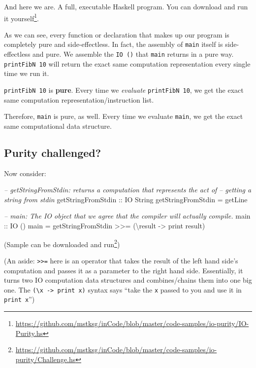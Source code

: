 \documentclass[]{article}
\newenvironment{Shaded}{}{}
\newcommand{\DataTypeTok}[1]{\textcolor[rgb]{0.56,0.13,0.00}{{#1}}}
\newcommand{\CommentTok}[1]{\textcolor[rgb]{0.38,0.63,0.69}{\textit{{#1}}}}
\newcommand{\OtherTok}[1]{\textcolor[rgb]{0.00,0.44,0.13}{{#1}}}
\newcommand{\FunctionTok}[1]{\textcolor[rgb]{0.02,0.16,0.49}{{#1}}}
\newcommand{\NormalTok}[1]{{#1}}
\renewcommand{\href}[2]{#2\footnote{\url{#1}}}
\begin{document}
And here we are. A full, executable Haskell program. You can
\href{https://github.com/mstksg/inCode/blob/master/code-samples/io-purity/IO-Purity.hs}{download and
run it yourself}.

As we can see, every function or declaration that makes up our program is completely pure and
side-effectless. In fact, the assembly of \texttt{main} itself is side-effectless and pure. We
assemble the \texttt{IO\ ()} that \texttt{main} returns in a pure way. \texttt{printFibN\ 10} will
return the exact same computation representation every single time we run it.

\texttt{printFibN\ 10} is \textbf{pure}. Every time we \emph{evaluate} \texttt{printFibN\ 10}, we
get the exact same computation representation/instruction list.

Therefore, \texttt{main} is pure, as well. Every time we evaluate \texttt{main}, we get the exact
same computational data structure.

\subsection{Purity challenged?}\label{purity-challenged}

Now consider:

\begin{Shaded}
\begin{Highlighting}[]
\CommentTok{--  getStringFromStdin: returns a computation that represents the act of}
\CommentTok{--      getting a string from stdin}
\OtherTok{getStringFromStdin ::} \DataTypeTok{IO} \DataTypeTok{String}
\NormalTok{getStringFromStdin }\FunctionTok{=} \NormalTok{getLine}

\CommentTok{--  main: The IO object that we agree that the compiler will actually compile.}
\OtherTok{main ::} \DataTypeTok{IO} \NormalTok{()}
\NormalTok{main }\FunctionTok{=} \NormalTok{getStringFromStdin }\FunctionTok{>>=} \NormalTok{(\textbackslash{}result }\OtherTok{->} \NormalTok{print result)}
\end{Highlighting}
\end{Shaded}

(Sample can be
\href{https://github.com/mstksg/inCode/blob/master/code-samples/io-purity/Challenge.hs}{downloaded
and run})

(An aside: \texttt{\textgreater{}\textgreater{}=} here is an operator that takes the result of the
left hand side's computation and passes it as a parameter to the right hand side. Essentially, it
turns two IO computation data structures and combines/chains them into one big one. The
\texttt{(\textbackslash{}x\ -\textgreater{}\ print\ x)} syntax says ``take the \texttt{x} passed to
you and use it in \texttt{print\ x}'')
\end{document}
